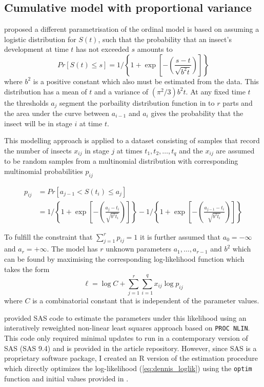 \subsection{Cumulative model with proportional variance}
\citet{dennis1986stochastic} proposed a different parametrisation of the ordinal model is based on assuming a logistic distribution for $S(t)$, such that the probability that an insect's development at time $t$ has not exceeded $s$ amounts to 
\begin{equation}
Pr[S(t) \leq s] = 1 \bigg/ \left\{ 1 + \exp\left[-\left(\frac{s-t}{\sqrt{b^2t}}\right)\right]\right\}
\end{equation}
where $b^2$ is a positive constant which also must be estimated from the data. This distribution has a mean of $t$ and a variance of $(\pi^2/3)b^2t$.
At any fixed time $t$ the thresholds $a_j$ segment the porbaility distribution function in to $r$ parts and the area under the curve between $a_{i-1}$ and $a_i$ gives the probability that the insect will be in stage $i$ at time $t$.

This modelling approach is applied to a dataset consisting of samples that record the number of insects $x_{ij}$ in stage $j$ at times $t_1, t_2, \dots, t_q$ and the $x_{ij}$ are assumed to be random samples from a multinomial distribution with corresponding multinomial probabilities $p_{ij}$

\begin{align}
p_{ij} & = Pr[a_{j-1} < S(t_i) \leq a_{j}]\\
& = 1 \bigg/ \left\{ 1 + \exp\left[-\left(\frac{a_j-t_i}{\sqrt{b^2t_i}}\right)\right]\right\} - 1 \bigg/ \left\{ 1 + \exp\left[-\left(\frac{a_{j-1}-t_i}{\sqrt{b^2t_i}}\right)\right]\right\}
\end{align}

To fulfill the constraint that $\sum_{j=1}^r p_{ij}= 1$ it is further assumed that $a_0 = -\infty$ and $a_r = +\infty$.
The model has $r$ unknown parameters $a_1, \dots, a_{r-1}$ and $b^2$ which can be found by maximising the corresponding log-likelihood function which takes the form 
\begin{equation}
\mathcal{\ell} = \log C + \sum_{j=1}^r \sum_{i=1}^q x_{ij} \log p_{ij}
\label{eq:dennis_loglik}
\end{equation}
where $C$ is a combinatorial constant that is independent of the parameter values.

\citet{dennis1986stochastic} provided SAS code to estimate the parameters under this likelihood using an interatively reweighted non-linear least squares approach based on \verb+PROC NLIN+. This code only required minimal updates to run in a contemporary version of SAS (SAS 9.4) and is provided in the article repository. However, since SAS is a proprietary software package, I created an R version of the estimation procedure which directly optimizes the log-likelihood (\ref{eq:dennis_loglik}) using the \verb+optim+ function and initial values provided in \citep{dennis1986stochastic}.

